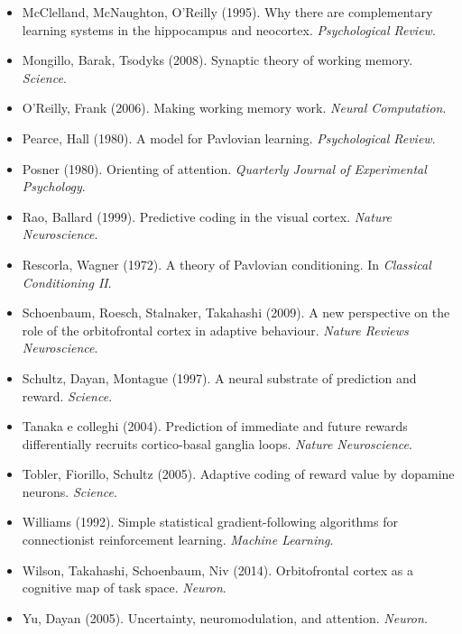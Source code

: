\documentclass[11pt,a4paper]{article}
\begin{document}
\begin{itemize}[leftmargin=1em,itemsep=1pt]
\item McClelland, McNaughton, O'Reilly (1995). Why there are complementary learning systems in the hippocampus and neocortex. \emph{Psychological Review}.
\item Mongillo, Barak, Tsodyks (2008). Synaptic theory of working memory. \emph{Science}.
\item O'Reilly, Frank (2006). Making working memory work. \emph{Neural Computation}.
\item Pearce, Hall (1980). A model for Pavlovian learning. \emph{Psychological Review}.
\item Posner (1980). Orienting of attention. \emph{Quarterly Journal of Experimental Psychology}.
\item Rao, Ballard (1999). Predictive coding in the visual cortex. \emph{Nature Neuroscience}.
\item Rescorla, Wagner (1972). A theory of Pavlovian conditioning. In \emph{Classical Conditioning II}.
\item Schoenbaum, Roesch, Stalnaker, Takahashi (2009). A new perspective on the role of the orbitofrontal cortex in adaptive behaviour. \emph{Nature Reviews Neuroscience}.
\item Schultz, Dayan, Montague (1997). A neural substrate of prediction and reward. \emph{Science}.
\item Tanaka e colleghi (2004). Prediction of immediate and future rewards differentially recruits cortico-basal ganglia loops. \emph{Nature Neuroscience}.
\item Tobler, Fiorillo, Schultz (2005). Adaptive coding of reward value by dopamine neurons. \emph{Science}.
\item Williams (1992). Simple statistical gradient-following algorithms for connectionist reinforcement learning. \emph{Machine Learning}.
\item Wilson, Takahashi, Schoenbaum, Niv (2014). Orbitofrontal cortex as a cognitive map of task space. \emph{Neuron}.
\item Yu, Dayan (2005). Uncertainty, neuromodulation, and attention. \emph{Neuron}.
\end{itemize}
\end{document}
